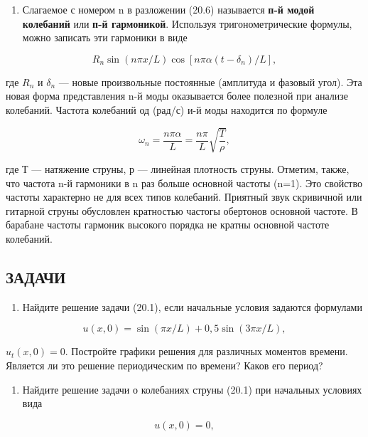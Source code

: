 \documentclass[
  ukrainian,
]{article}
\providecommand{\tightlist}{%
  \setlength{\itemsep}{0pt}\setlength{\parskip}{0pt}}
\begin{document}
\begin{enumerate}
\def\labelenumi{\arabic{enumi}.}
\setcounter{enumi}{1}
\tightlist
\item
  Слагаемое с номером n в разложении (20.6) называется \textbf{п-й модой
  колебаний} или \textbf{п-й гармоникой}. Используя тригонометрические
  формулы, можно записать эти гармоники в виде
\end{enumerate}

\[
R_n \sin(n\pi x/L) \cos[n\pi\alpha(t-\delta_n)/L],
\]

где \(R_n\) и \(\delta_n\) --- новые произвольные постоянные (амплитуда
и фазовый угол). Эта новая форма представления n-й моды оказывается
более полезной при анализе колебаний. Частота колебаний од (рад/с) и-й
моды находится по формуле

\[
\omega_n = \frac{n\pi\alpha}{L} = \frac{n\pi}{L} \sqrt{\frac{T}{\rho}},
\]

где Т --- натяжение струны, р --- линейная плотность струны. Отметим,
также, что частота n-й гармоники в n раз больше основной частоты (n=1).
Это свойство частоты характерно не для всех типов колебаний. Приятный
звук скривичной или гитарной струны обусловлен кратностью частогы
обертонов основной частоте. В барабане частоты гармоник высокого порядка
не кратны основной частоте колебаний.

\subsection{ЗАДАЧИ}\label{ux437ux430ux434ux430ux447ux438-2}

\begin{enumerate}
\def\labelenumi{\arabic{enumi}.}
\tightlist
\item
  Найдите решение задачи (20.1), если начальные условия задаются
  формулами
\end{enumerate}

\[
u(x, 0) = \sin(\pi x/L) + 0,5 \sin(3\pi x/L),
\]

\(u_t(x, 0) = 0.\) Постройте графики решения для различных моментов
времени. Является ли это решение периодическим по времени? Каков его
период?

\begin{enumerate}
\def\labelenumi{\arabic{enumi}.}
\setcounter{enumi}{1}
\tightlist
\item
  Найдите решение задачи о колебаниях струны (20.1) при начальных
  условиях вида
\end{enumerate}

\[
u(x, 0) = 0,
\]
\end{document}
